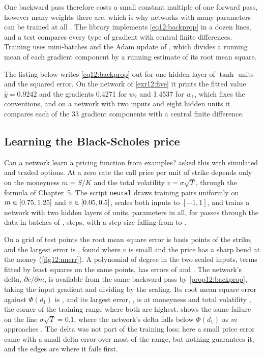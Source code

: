\begin{chapterrefs}
One backward pass therefore costs a small constant multiple of one forward pass, however many weights
there are,
which is why networks with many parameters can be trained at all \parencite{rumelhart1986}. The library
implements \cref{eq12:backprop} in a dozen lines, and a test compares every type of gradient with central
finite differences. Training uses mini-batches and the Adam update of \textcite{kingma2015}, which divides a
running mean of each gradient component by a running estimate of its root mean square.

The listing below writes \cref{eq12:backprop} out for one hidden layer of $\tanh$ units and the squared
error. On the network of \cref{exr12:five} it prints the fitted value $\hat y=0.9242$ and the gradients 0.4271 for $w_2$
and 1.4537 for $w_1$, which fixes the conventions, and on a network with two inputs and eight hidden
units it compares each of the 33 gradient components with a central finite difference.


\subsection{Learning the Black-Scholes price}

Can a network learn a pricing function from examples? \Textcite{hutchinson1994} asked this with simulated
and traded options. At a zero rate the call price per unit of strike depends only on the moneyness $m=S/K$
and the total volatility $v=\sigma\sqrt T$, through the formula of Chapter~5. The script \texttt{neural}
draws \nnNtr{} training pairs uniformly on $m\in[0.75,1.25]$ and $v\in[0.05,0.5]$, scales both
inputs to $[-1,1]$, and trains a network with two hidden layers of \nnHid{} units, \nnParams{} parameters in
all, for \nnEpochs{} passes through the data in batches of \nnBatch, \nnSteps{} steps, with a step size
falling from \nnLr{} to \nnLrEnd.

On a grid of test points the root mean square error is \nnRmse{} basis points of the strike, and the
largest error is \nnMax, found where $v$ is small and the price has a sharp bend at the money
(\cref{fig12:nnerr}). A polynomial of degree \nnPolyDeg{} in the two scaled inputs, \nnPolyTerms{} terms fitted
by least squares on the same points, has errors of \nnPolyRmse{} and \nnPolyMax{}. The network's delta,
$\partial c/\partial m$, is available from the same backward pass by \cref{prop12:backprop}, taking the input
gradient and dividing by the scaling. Its root mean square error against $\Phi(d_1)$ is \nnDeltaRmse, and its
largest error, \nnDeltaMax, is at moneyness \nnDeltaMaxM{} and total volatility \nnDeltaMaxV, the corner of the training range where both are
highest.  shows the same failure on the line $\sigma\sqrt T=0.1$, where the
network's delta falls below $\Phi(d_1)$ as $m$ approaches \nnMhi. The delta was not part of the training loss; here a small price error came with a
small delta error over most of the range, but nothing guarantees it, and the edges are where it fails first.


\end{chapterrefs}
